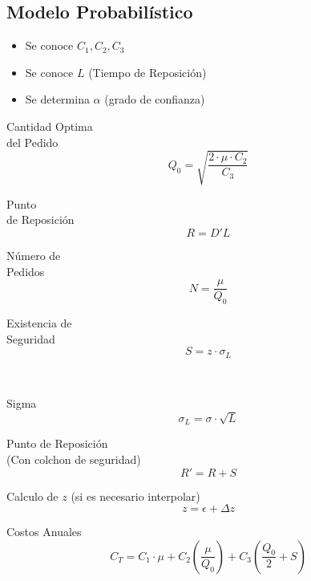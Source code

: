 \documentclass[10pt,letterpaper]{article}
\begin{document}
\subsection{Modelo Probabilístico}
\begin{itemize}
\item Se conoce $C_1,C_2,C_3$
\item Se conoce $L$ (Tiempo de Reposición)
\item Se determina $\alpha$ (grado de confianza)
\end{itemize}
\begin{enumerate}
\noindent
\begin{minipage}[t]{.25\textwidth}
\raggedright
\item Cantidad Optima \\ del Pedido
$$
Q_0 = \sqrt{\dfrac{2 \cdot  \mu  \cdot  C_2}{C_3}}
$$
\end{minipage}%
\begin{minipage}[t]{.25\textwidth}
\raggedright
\item Punto \\ de Reposición
$$
R = D' L
$$
\end{minipage}%
\begin{minipage}[t]{.25\textwidth}
\raggedright
\item Número de\\ Pedidos
$$
N=\dfrac{\mu}{Q_0}
$$
\end{minipage}%
\begin{minipage}[t]{.25\textwidth}
\raggedright
\item Existencia de\\ Seguridad
$$
S = z \cdot \sigma_L
$$
\end{minipage}
\\${ }$\\
\begin{minipage}[t]{.33\textwidth}
\raggedright
\item Sigma
$$
\sigma_L = \sigma \cdot \sqrt{L}
$$
\end{minipage}%
\begin{minipage}[t]{.33\textwidth}
\raggedright
\item Punto de Reposición \\ (Con colchon de seguridad)
$$
R'=R+S
$$
\end{minipage}%
\begin{minipage}[t]{.33\textwidth}
\raggedright
\item Calculo de $z$ (si es necesario interpolar)
$$
z = \epsilon + \Delta z
$$
\end{minipage}
\item Costos Anuales
$$
C_T = C_1 \cdot\mu + C_2 \left( \dfrac{\mu}{Q_0}\right) + C_3 \left( \dfrac{Q_0}{2}+S \right)
$$
\end{enumerate}
\end{document}
